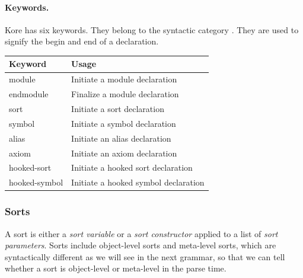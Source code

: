 \documentclass[UTF8,11pt]{article}
\theoremstyle{plain}
\theoremstyle{definition}
\theoremstyle{remark}
\newcommand{\syntacc}[1]{\text{$\langle$\textit{#1}$\rangle$}}
\begin{document}
\paragraph{Keywords.}
Kore has six keywords.
They belong to the syntactic category \syntacc{keyword}.
They are used to signify the begin and end of a declaration.
\begin{center}
 {\ttfamily
  \begin{tabular}{l|l}
   \textrm{Keyword} & \textrm{Usage}
   \\\hline
   module & \textrm{Initiate a module declaration}
   \\
   endmodule & \textrm{Finalize a module declaration}
   \\
   sort & \textrm{Initiate a sort declaration}
   \\
   symbol & \textrm{Initiate a symbol declaration}
   \\
   alias & \textrm{Initiate an alias declaration}
   \\
   axiom & \textrm{Initiate an axiom declaration}
      \\
      hooked-sort & \textrm{Initiate a hooked sort declaration}
      \\
      hooked-symbol & \textrm{Initiate a hooked symbol declaration}
 \end{tabular}}
\end{center}


\subsubsection{Sorts}
\label{sec:kore-syntax-sorts}
A sort is either a \emph{sort variable} or a \emph{sort constructor} applied to
a list of \emph{sort parameters}.
Sorts include object-level sorts and meta-level sorts, which are syntactically
different as we will see in the next grammar, so that we can tell whether a
sort is object-level or meta-level in the parse time.
\end{document}
